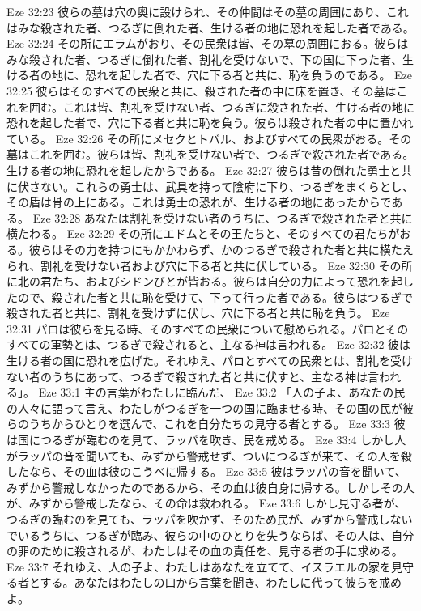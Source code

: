 Eze 32:23  彼らの墓は穴の奥に設けられ、その仲間はその墓の周囲にあり、これはみな殺された者、つるぎに倒れた者、生ける者の地に恐れを起した者である。
Eze 32:24  その所にエラムがおり、その民衆は皆、その墓の周囲におる。彼らはみな殺された者、つるぎに倒れた者、割礼を受けないで、下の国に下った者、生ける者の地に、恐れを起した者で、穴に下る者と共に、恥を負うのである。
Eze 32:25  彼らはそのすべての民衆と共に、殺された者の中に床を置き、その墓はこれを囲む。これは皆、割礼を受けない者、つるぎに殺された者、生ける者の地に恐れを起した者で、穴に下る者と共に恥を負う。彼らは殺された者の中に置かれている。
Eze 32:26  その所にメセクとトバル、およびすべての民衆がおる。その墓はこれを囲む。彼らは皆、割礼を受けない者で、つるぎで殺された者である。生ける者の地に恐れを起したからである。
Eze 32:27  彼らは昔の倒れた勇士と共に伏さない。これらの勇士は、武具を持って陰府に下り、つるぎをまくらとし、その盾は骨の上にある。これは勇士の恐れが、生ける者の地にあったからである。
Eze 32:28  あなたは割礼を受けない者のうちに、つるぎで殺された者と共に横たわる。
Eze 32:29  その所にエドムとその王たちと、そのすべての君たちがおる。彼らはその力を持つにもかかわらず、かのつるぎで殺された者と共に横たえられ、割礼を受けない者および穴に下る者と共に伏している。
Eze 32:30  その所に北の君たち、およびシドンびとが皆おる。彼らは自分の力によって恐れを起したので、殺された者と共に恥を受けて、下って行った者である。彼らはつるぎで殺された者と共に、割礼を受けずに伏し、穴に下る者と共に恥を負う。
Eze 32:31  パロは彼らを見る時、そのすべての民衆について慰められる。パロとそのすべての軍勢とは、つるぎで殺されると、主なる神は言われる。
Eze 32:32  彼は生ける者の国に恐れを広げた。それゆえ、パロとすべての民衆とは、割礼を受けない者のうちにあって、つるぎで殺された者と共に伏すと、主なる神は言われる」。
Eze 33:1  主の言葉がわたしに臨んだ、
Eze 33:2  「人の子よ、あなたの民の人々に語って言え、わたしがつるぎを一つの国に臨ませる時、その国の民が彼らのうちからひとりを選んで、これを自分たちの見守る者とする。
Eze 33:3  彼は国につるぎが臨むのを見て、ラッパを吹き、民を戒める。
Eze 33:4  しかし人がラッパの音を聞いても、みずから警戒せず、ついにつるぎが来て、その人を殺したなら、その血は彼のこうべに帰する。
Eze 33:5  彼はラッパの音を聞いて、みずから警戒しなかったのであるから、その血は彼自身に帰する。しかしその人が、みずから警戒したなら、その命は救われる。
Eze 33:6  しかし見守る者が、つるぎの臨むのを見ても、ラッパを吹かず、そのため民が、みずから警戒しないでいるうちに、つるぎが臨み、彼らの中のひとりを失うならば、その人は、自分の罪のために殺されるが、わたしはその血の責任を、見守る者の手に求める。
Eze 33:7  それゆえ、人の子よ、わたしはあなたを立てて、イスラエルの家を見守る者とする。あなたはわたしの口から言葉を聞き、わたしに代って彼らを戒めよ。
